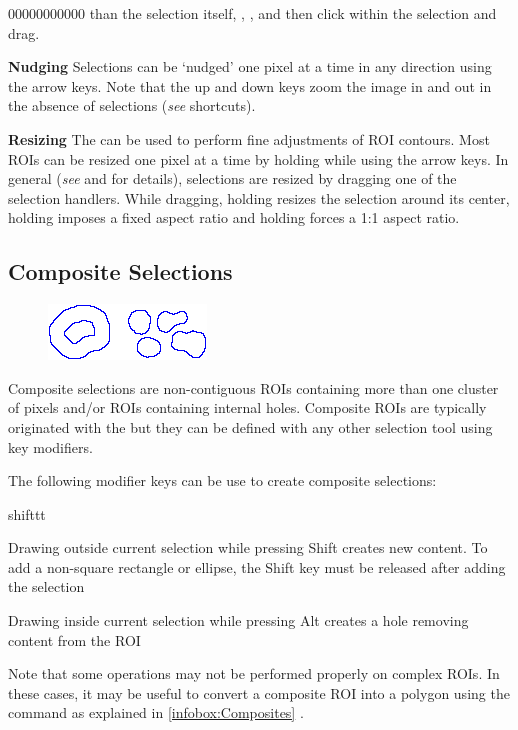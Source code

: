 \begin{lyxlist}{00000000000}
than the selection itself, \textsf{},
\textsf{},
and then click within the selection and drag.
\item [{\textbf{Nudging}}] \noindent Selections can be `nudged' one pixel
at a time in any direction using the arrow keys. Note that the up
and down keys zoom the image in and out in the absence of selections
(\emph{see}  shortcuts).
\item [{\textbf{Resizing}}] The  can
be used to perform fine adjustments of ROI contours. Most ROIs can
be resized one pixel at a time by holding  while
using the arrow keys. In general (\emph{see} 
and  for details), selections are
resized by dragging one of the selection handlers. While dragging,
holding  resizes the selection around its center,
holding  imposes a fixed aspect ratio and holding
 forces a 1:1 aspect ratio.
\end{lyxlist}



\subsection{Composite Selections\label{sub:Composite-selections}}

\begin{figure}%
\includegraphics[scale=0.6]{images/compositeROI}\end{figure}%
Composite selections are non-contiguous ROIs containing more than
one cluster of pixels and/or ROIs containing internal holes. Composite
ROIs are typically originated with the 
but they can be defined with any other selection tool using key modifiers. 

The following modifier keys can be use to create composite selections:
\begin{lyxlist}{shifttt}
\item [{\mykeystroke{Shift}}] \noindent Drawing outside current selection
while pressing Shift creates new content. To add a non-square rectangle
or ellipse, the Shift key must be released after adding the selection
\item [{\mykeystroke{Alt}}] Drawing inside current selection while pressing
Alt creates a hole removing content from the ROI
\end{lyxlist}
Note that some operations may not be performed properly on complex
ROIs. In these cases, it may be useful to convert a composite ROI
into a polygon using the 
command as explained in \ref{infobox:Composites} .


